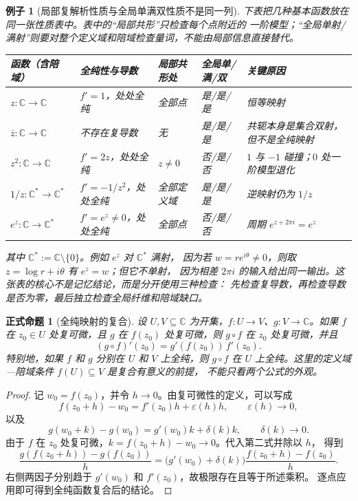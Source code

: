 \documentclass[UTF8,fontset=none,a4paper,11pt]{ctexart}
\theoremstyle{foundation-definition}
\theoremstyle{foundation-theorem}
\theoremstyle{foundation-proposition}
\newtheorem{proposition}[definition]{正式命题}
\theoremstyle{foundation-example}
\newtheorem{example}[definition]{例子}
\theoremstyle{foundation-remark}
\theoremstyle{foundation-theorem}
\begin{document}
\begin{example}[局部复解析性质与全局单满双性质不是同一列]
下表把几种基本函数放在同一张性质表中。表中的“局部共形”只检查每个点附近的
一阶模型；“全局单射/满射”则要对整个定义域和陪域检查量词，不能由局部信息直接替代。
\begin{center}
\small
\begin{tabularx}{\textwidth}{p{}p{}p{}p{}X}
\toprule
函数（含陪域） & 全纯性与导数 & 局部共形处 & 全局单/满/双 & 关键原因 \\
\midrule
$z:\mathbb C\to\mathbb C$
& $f'=1$，处处全纯 & 全部点 & 是/是/是 & 恒等映射 \\
$\overline z:\mathbb C\to\mathbb C$
& 不存在复导数 & 无 & 是/是/是 & 共轭本身是集合双射，但不是全纯映射 \\
$z^2:\mathbb C\to\mathbb C$
& $f'=2z$，处处全纯 & $z\ne0$ & 否/是/否 & $1$ 与 $-1$ 碰撞；$0$ 处一阶模型退化 \\
$1/z:\mathbb C^*\to\mathbb C^*$
& $f'=-1/z^2$，处处全纯 & 全部定义域 & 是/是/是 & 逆映射仍为 $1/z$ \\
$e^z:\mathbb C\to\mathbb C^*$
& $f'=e^z\ne0$，处处全纯 & 全部点 & 否/是/否 & 周期 $e^{z+2\pi i}=e^z$ \\
\bottomrule
\end{tabularx}
\end{center}
其中 \(\mathbb C^*:=\mathbb C\setminus\{0\}\)。例如 \(e^z\) 对 \(\mathbb C^*\) 满射，
因为若 \(w=re^{i\theta}\ne0\)，则取 \(z=\log r+i\theta\) 有 \(e^z=w\)；但它不单射，
因为相差 \(2\pi i\) 的输入给出同一输出。这张表的核心不是记忆结论，而是分开使用三种检查：
先检查复导数，再检查导数是否为零，最后独立检查全局纤维和陪域缺口。
\end{example}

\begin{proposition}[全纯映射的复合]
\label{prop:holomorphic-composition}
设 $U,V\subseteq\mathbb C$ 为开集，$f:U\to V$、$g:V\to\mathbb C$。如果
$f$ 在 $z_0\in U$ 处复可微，且 $g$ 在 $f(z_0)$ 处复可微，则 $g\circ f$
在 $z_0$ 处复可微，并且
\[
 (g\circ f)'(z_0)=g'(f(z_0))\,f'(z_0).
\]
特别地，如果 $f$ 和 $g$ 分别在 $U$ 和 $V$ 上全纯，则 $g\circ f$ 在
$U$ 上全纯。这里的定义域—陪域条件 $f(U)\subseteq V$ 是复合有意义的前提，
不能只看两个公式的外观。
\end{proposition}

\begin{proof}
记 $w_0=f(z_0)$，并令 $h\to0$。由复可微性的定义，可以写成
\[
 f(z_0+h)-w_0=f'(z_0)h+\varepsilon(h)h,
 \qquad \varepsilon(h)\to0,
\]
以及
\[
 g(w_0+k)-g(w_0)=g'(w_0)k+\delta(k)k,
 \qquad \delta(k)\to0.
\]
由于 $f$ 在 $z_0$ 处复可微，$k=f(z_0+h)-w_0\to0$。代入第二式并除以 $h$，
得到
\[
 \frac{g(f(z_0+h))-g(f(z_0))}{h}
 =\bigl(g'(w_0)+\delta(k)\bigr)
   \frac{f(z_0+h)-f(z_0)}{h}.
\]
右侧两因子分别趋于 $g'(w_0)$ 和 $f'(z_0)$，故极限存在且等于所述乘积。
逐点应用即可得到全纯函数复合后的结论。
\end{proof}
\end{document}
